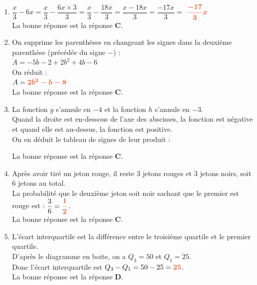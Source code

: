 \documentclass[a4paper,11pt]{article}
\newcounter{seancenum}
\newcounter{seancenumD}
\begin{document}
\setcounter{seancenumD}{30}
\newpage
\begin{seanceD}{} %

\begin{enumerate}
\item $\dfrac{x}{3}-6x=\dfrac{x}{3}-\dfrac{6x\times 3}{3}=\dfrac{x}{3}-\dfrac{18x}{3}=\dfrac{x-18x}{3}=\dfrac{-17x}{3}=$ ${\color[HTML]{F15929}\boldsymbol{\dfrac{-17}{3}x}}$\\La bonne réponse est la réponse {\bfseries \color[HTML]{F15929}C}.

\item On supprime les parenthèses en changeant les signes dans la deuxième parenthèse (précédée du signe $-$) :\\$A= -5b-2 +2b^2+4b-6$\\On réduit :\\$A={\color[HTML]{F15929}\boldsymbol{2b^2-b-8}}$\\La bonne réponse est la réponse {\bfseries \color[HTML]{F15929}C}.

\item La fonction $g$ s'annule en $-4$ et la fonction $h$ s'annule en $-3$.\\
    Quand la droite est en-dessous de l'axe des abscisses, la fonction est négative et quand elle est au-dessus, la fonction est positive.\\
    On en déduit le tableau de signes de leur produit :\\
   \begin{center}
   \end{center}
La bonne réponse est la réponse {\bfseries \color[HTML]{F15929}C}.

\item Après avoir tiré un jeton rouge, il reste $3$ jetons rouges et $3$ jetons noirs, soit $6$ jetons au total.\\La probabilité que le deuxième jeton soit noir sachant que le premier est rouge est : $\dfrac{3}{6}={\color[HTML]{F15929}\boldsymbol{\dfrac{1}{2}}}$.\\La bonne réponse est la réponse {\bfseries \color[HTML]{F15929}C}.

\item L'écart interquartile est la différence entre le troisième quartile et le premier quartile.\\
      D'après le diagramme en boite, on a $Q_3 = 50$ et $Q_1 = 25$.\\
      Donc l'écart interquartile est $Q_3 - Q_1 = 50 - 25 = {\color[HTML]{F15929}\boldsymbol{25}}$.\\La bonne réponse est la réponse {\bfseries \color[HTML]{F15929}D}.


\end{enumerate}
\end{seanceD}
\end{document}
